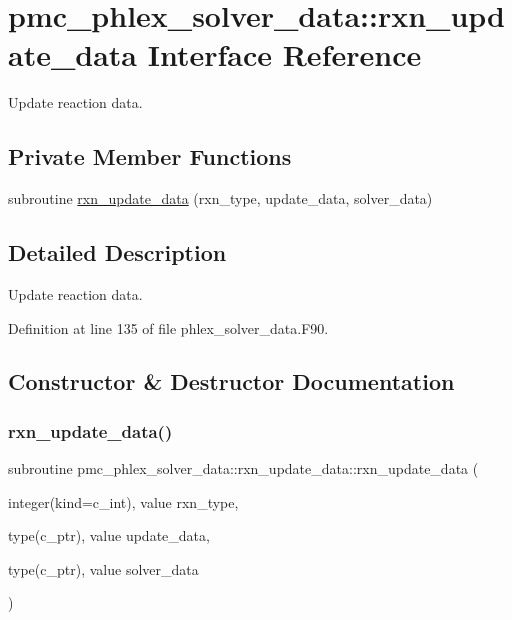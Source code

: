 \hypertarget{interfacepmc__phlex__solver__data_1_1rxn__update__data}{}\section{pmc\+\_\+phlex\+\_\+solver\+\_\+data\+:\+:rxn\+\_\+update\+\_\+data Interface Reference}
\label{interfacepmc__phlex__solver__data_1_1rxn__update__data}


Update reaction data.  


\subsection*{Private Member Functions}
\begin{DoxyCompactItemize}
\item 
subroutine \mbox{\hyperlink{interfacepmc__phlex__solver__data_1_1rxn__update__data_a60013bb865175f92a7a02d510390305d}{rxn\+\_\+update\+\_\+data}} (rxn\+\_\+type, update\+\_\+data, solver\+\_\+data)
\end{DoxyCompactItemize}


\subsection{Detailed Description}
Update reaction data. 

Definition at line 135 of file phlex\+\_\+solver\+\_\+data.\+F90.



\subsection{Constructor \& Destructor Documentation}
\mbox{\label{interfacepmc__phlex__solver__data_1_1rxn__update__data_a60013bb865175f92a7a02d510390305d}} 
\subsubsection{\texorpdfstring{rxn\+\_\+update\+\_\+data()}{rxn\_update\_data()}}
{\footnotesize\ttfamily subroutine pmc\+\_\+phlex\+\_\+solver\+\_\+data\+::rxn\+\_\+update\+\_\+data\+::rxn\+\_\+update\+\_\+data (\begin{DoxyParamCaption}\item[{integer(kind=c\+\_\+int), value}]{rxn\+\_\+type,  }\item[{type(c\+\_\+ptr), value}]{update\+\_\+data,  }\item[{type(c\+\_\+ptr), value}]{solver\+\_\+data }\end{DoxyParamCaption})\hspace{0.3cm}{\ttfamily [private]}}


